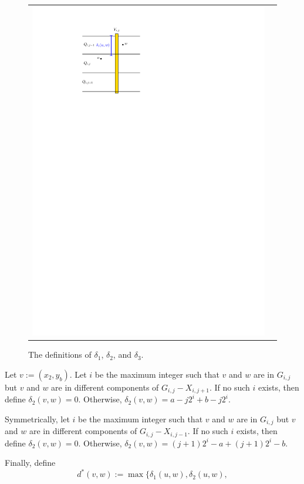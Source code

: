 \documentclass{patmorin}
\begin{document}
\begin{figure}
\begin{tabular}{cc}
    \includegraphics[page=3]{figs/new_metric}
    \end{tabular}
    \caption{The definitions of $\delta_1$, $\delta_2$, and $\delta_3$.}
\end{figure}

Let $v:=(x_2,y_b)$.  Let $i$ be the maximum integer such that $v$ and $w$ are in $G_{i,j}$ but $v$ and $w$ are in different components of $G_{i,j}-X_{i,j+1}$.  If no such $i$ exists, then define $\delta_2(v,w)=0$.  Otherwise,  $\delta_2(v,w)=a-j2^i + b-j2^i$.

Symmetrically, let $i$ be the maximum integer such that $v$ and $w$ are in $G_{i,j}$ but $v$ and $w$ are in different components of $G_{i,j}-X_{i,j-1}$.  If no such $i$ exists, then define $\delta_2(v,w)=0$.  Otherwise,  $\delta_2(v,w)=(j+1)2^i-a + (j+1)2^i-b$.

Finally, define
\[   d^*(v,w) := \max\{\delta_1(u,w), \delta_2(u,w), \]
\end{document}

